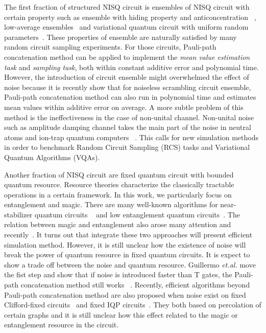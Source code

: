 \documentclass[aps,%
twocolumn,%
floatfix,%
pra,%
amsfonts,%
longbibliography,%
groupedaddress,%
superscriptaddress]{revtex4-2}%
\newcommand{\1}{\mathbbm{1}}
\begin{document}
The first fraction of structured NISQ circuit is ensembles of NISQ circuit with certain property such as ensemble with hiding property and anticoncentration~\cite{aharonov2023polynomial} , low-average ensembles~\cite{schuster2024polynomial} and variational quantum circuit with uniform random parameters~\cite{shao2023simulating}. These properties of ensemble are naturally satisfied by many random circuit sampling experiments. For those circuits, Pauli-path concatenation method can be applied to implement the \textit{mean value estimation task} and \textit{sampling task}, both within constant additive error and polynomial time. 
However, the introduction of circuit ensemble might overwhelmed the effect of noise because it is recently show that for noiseless scrambling circuit ensemble, Pauli-path concatenation method can also run in polynomial time and estimates mean values within additive error on average\cite{angrisani2024classically}. A more subtle problem of this method is the ineffectiveness in the case of non-unital channel. Non-unital noise such as amplitude damping channel takes the main part of the noise in neutral atoms and ion-trap quantum computers~\cite{cong2022hardware,sahay2023high} . This calls for new simulation methods in order to benchmark Random Circuit Sampling (RCS) tasks and Variational Quantum Algorithms (VQAs).

Another fraction of NISQ circuit are fixed quantum circuit with bounded quantum resource. 
Resource theories characterize the classically tractable operations in a certain framework. In this work, we particularly focus on entanglement and magic.
There are many well-known algorithms for near-stabilizer quantum circuits ~\cite{bravyi2016improved,bravyi2019simulation,seddon2021quantifying} and 
low entanglement quantum circuits~\cite{markov2008simulating,van2007classical}. 
The relation between magic and entanglement also arose many attention and recently~\cite{gu2024magic,masot2024stabilizer}.
It turns out that integrate these two approaches will present efficient simulation method. However, it is still unclear how the existence of noise will break the power of quantum resource in fixed quantum circuits. 
It is expect to show a trade off between the noise and quantum resource. Guillermo \emph{et.al.} move the fist step and show that  if noise is introduced faster than T gates, the Pauli-path concatenation method still works ~\cite{gonzalez2024pauli}. 
Recently, efficient algorithms beyond Pauli-path concatenation method are also proposed when noise exist on fixed Clifford-fixed circuits~\cite{nelson2024polynomial} and fixed IQP circuits~\cite{rajakumar2024polynomialtimeclassicalsimulationnoisy}. They both based on percolation of certain graphs and it is still unclear how this effect related to the magic or entanglement resource in the circuit.
\end{document}
